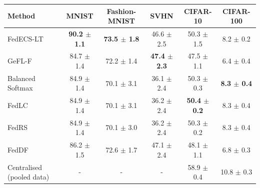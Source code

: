 \begin{tabular}{lccccc}
\toprule
Method & MNIST & Fashion-MNIST & SVHN & CIFAR-10 & CIFAR-100\\
\midrule
FedECS-LT & \textbf{90.2 $\pm$ 1.1} & \textbf{73.5 $\pm$ 1.8} & 46.6 $\pm$ 2.5 & 50.3 $\pm$ 1.5 & 8.2 $\pm$ 0.2\\
GeFL-F & 84.7 $\pm$ 1.4 & 72.2 $\pm$ 1.4 & \textbf{47.4 $\pm$ 2.3} & 47.5 $\pm$ 1.1 & 6.4 $\pm$ 0.4\\
Balanced Softmax & 84.9 $\pm$ 1.4 & 70.1 $\pm$ 3.1 & 36.1 $\pm$ 2.4 & 50.3 $\pm$ 0.3 & \textbf{8.3 $\pm$ 0.4}\\
FedLC & 84.9 $\pm$ 1.4 & 70.1 $\pm$ 3.1 & 36.2 $\pm$ 2.4 & \textbf{50.4 $\pm$ 0.2} & 8.3 $\pm$ 0.4\\
FedRS & 84.9 $\pm$ 1.4 & 70.1 $\pm$ 3.0 & 36.2 $\pm$ 2.4 & 50.3 $\pm$ 0.2 & 8.3 $\pm$ 0.4\\
FedDF & 86.2 $\pm$ 1.5 & 72.6 $\pm$ 1.7 & 47.1 $\pm$ 2.4 & 48.1 $\pm$ 1.1 & 6.8 $\pm$ 0.3\\
Centralised (pooled data) & - & - & - & 58.9 $\pm$ 0.4 & 10.8 $\pm$ 0.3\\
\bottomrule
\end{tabular}
